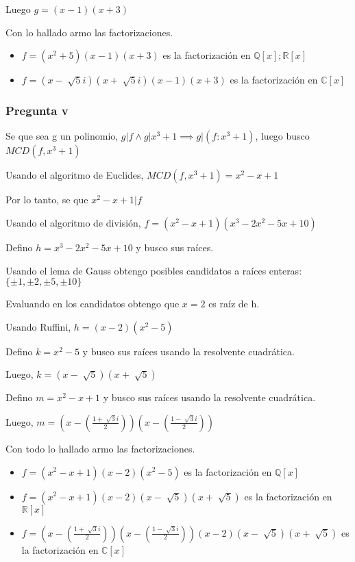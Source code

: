 Luego $ g = (x-1)(x+3) $

Con lo hallado armo las factorizaciones.
\begin{itemize}
    \item $ f = (x^2 + 5)(x-1)(x+3) $ es la factorización en $ \mathbb{Q}[x]; \mathbb{R}[x] $
    \item $ f = (x-\sqrt[]{5}i)(x+\sqrt[]{5}i)(x-1)(x+3) $ es la factorización en $ \mathbb{C}[x] $
\end{itemize}

\subsubsection{Pregunta v}

Se que sea g un polinomio, $ g|f \wedge g|x^3+1 \implies g|(f:x^3+1) $, luego busco $ MCD(f, x^3+1) $

Usando el algoritmo de Euclides, $ MCD(f, x^3+1) = x^2-x+1 $

Por lo tanto, se que $ x^2-x+1 | f $

Usando el algoritmo de división, $ f = (x^2-x+1)(x^3-2x^2-5x+10) $

Defino $ h = x^3-2x^2-5x+10 $ y busco sus raíces.

Usando el lema de Gauss obtengo posibles candidatos a raíces enteras: $ \{ \pm 1, \pm 2, \pm 5, \pm 10 \} $

Evaluando en los candidatos obtengo que $ x = 2 $ es raíz de h.

Usando Ruffini, $ h = (x-2)(x^2-5) $

Defino $ k = x^2 - 5 $ y busco sus raíces usando la resolvente cuadrática.

Luego, $ k = (x-\sqrt[]{5})(x+\sqrt[]{5}) $

Defino $ m = x^2-x+1 $ y busco sus raíces usando la resolvente cuadrática.

Luego, $ m = (x-(\frac{1+\sqrt[]{3}i}{2}))(x-(\frac{1-\sqrt[]{3}i}{2})) $

Con todo lo hallado armo las factorizaciones.

\begin{itemize}
    \item $ f = (x^2-x+1)(x-2)(x^2-5) $ es la factorización en $ \mathbb{Q}[x] $
    \item $ f = (x^2-x+1)(x-2)(x-\sqrt[]{5})(x+\sqrt[]{5}) $ es la factorización en $ \mathbb{R}[x] $
    \item $ f = (x-(\frac{1+\sqrt[]{3}i}{2}))(x-(\frac{1-\sqrt[]{3}i}{2}))(x-2)(x-\sqrt[]{5})(x+\sqrt[]{5}) $ es la factorización en $ \mathbb{C}[x] $
\end{itemize}

